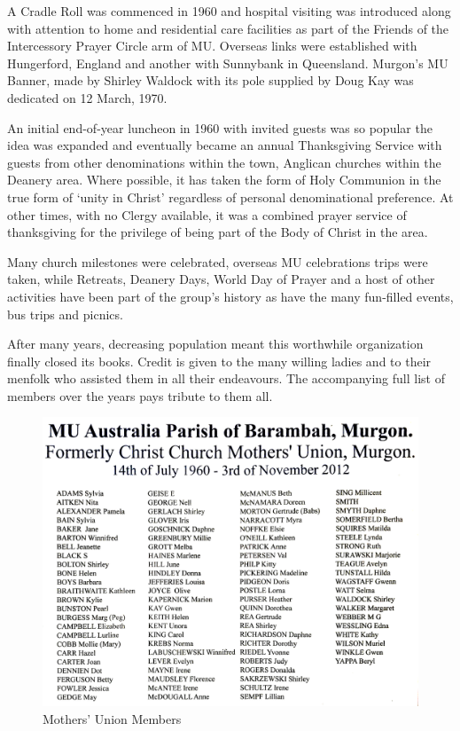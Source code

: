 A Cradle Roll was commenced in 1960 and hospital visiting was introduced along with attention to home and residential care facilities as part of the Friends of the Intercessory Prayer Circle arm of MU. Overseas links were established with Hungerford, England and another with Sunnybank in Queensland. Murgon's MU Banner, made by Shirley Waldock with its pole supplied by Doug Kay was dedicated on 12 March, 1970.



An initial end-of-year luncheon in 1960 with invited guests was so popular the idea was expanded and eventually became an annual Thanksgiving Service with guests from other denominations within the town, Anglican churches within the Deanery area. Where possible, it has taken the form of Holy Communion in the true form of `unity in Christ' regardless of personal denominational preference. At other times, with no Clergy available, it was a combined prayer service of thanksgiving for the privilege of being part of the Body of Christ in the area.



Many church milestones were celebrated, overseas MU celebrations trips were taken, while Retreats, Deanery Days, World Day of Prayer and a host of other activities have been part of the group's history as have the many fun-filled events, bus trips and picnics.



After many years, decreasing population meant this worthwhile organization finally closed its books. Credit is given to the many willing ladies and to their menfolk who assisted them in all their endeavours. The accompanying full list of members over the years pays tribute to them all.









\begin{figure}[!htb]
\begin{center}
\includegraphics[width=1.\textwidth,center]{../images/MothersUnionNames.jpg}
\caption{Mothers' Union Members}
\end{center}
\end{figure}


